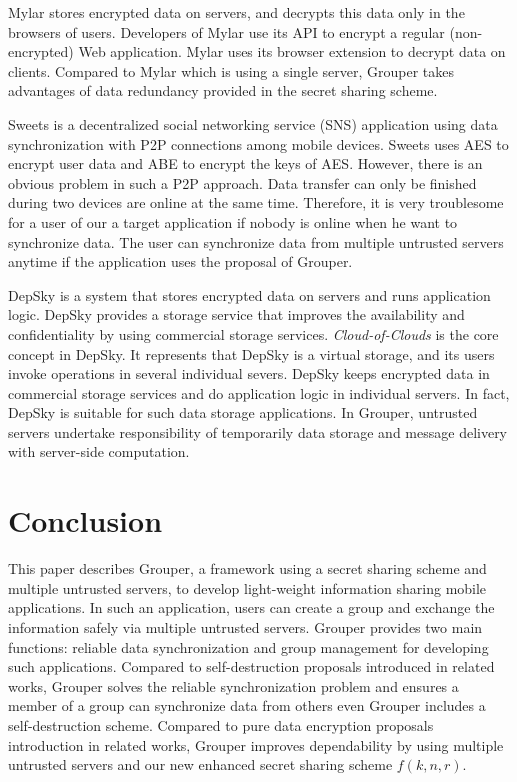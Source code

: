 \documentclass[twocolumn,10pt]{article}
\begin{document}
Mylar stores encrypted data on servers, and decrypts this data only in the browsers of users. 
Developers of Mylar use its API to encrypt a regular (non-encrypted) Web application. 
Mylar uses its browser extension to decrypt data on clients. 
Compared to Mylar which is using a single server, Grouper takes advantages of data redundancy provided in the secret sharing scheme.

Sweets is a decentralized social networking service (SNS) application using data synchronization with P2P connections among mobile devices. 
Sweets uses AES to encrypt user data and ABE to encrypt the keys of AES. 
However, there is an obvious problem in such a P2P approach. 
Data transfer can only be finished during two devices are online at the same time. 
Therefore, it is very troublesome for a user of our a target application if nobody is online when he want to synchronize data.
The user can synchronize data from multiple untrusted servers anytime if the application uses the proposal of Grouper.

DepSky\cite{bessani2013depsky} is a system that stores encrypted data on servers and runs application logic. 
DepSky provides a storage service that improves the availability and confidentiality by using commercial storage services. 
\emph{Cloud-of-Clouds} is the core concept in DepSky. 
It represents that DepSky is a virtual storage, and its users invoke operations in several individual severs. 
DepSky keeps encrypted data in commercial storage services and do application logic in individual servers.
In fact, DepSky is suitable for such data storage applications. 
In Grouper, untrusted servers undertake responsibility of temporarily data storage and message delivery with server-side computation.

\section{Conclusion}

This paper describes Grouper, a framework using a secret sharing scheme and multiple untrusted servers, to develop light-weight information sharing mobile applications.
In such an application, users can create a group and exchange the information safely via multiple untrusted servers.
Grouper provides two main functions: reliable data synchronization and group management for developing such applications.
Compared to self-destruction proposals introduced in related works, Grouper solves the reliable synchronization problem and ensures a member of a group can synchronize data from others even Grouper includes a self-destruction scheme.
Compared to pure data encryption proposals introduction in related works, Grouper improves dependability by using multiple untrusted servers and our new enhanced secret sharing scheme $f(k, n, r)$.
\end{document}
